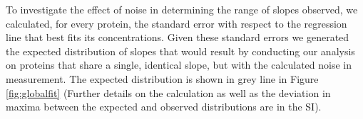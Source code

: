 To investigate the effect of noise in determining the range of slopes observed, we calculated, for every protein, the standard error with respect to the regression line that best fits its concentrations.
Given these standard errors we generated the expected distribution of slopes that would result by conducting our analysis on proteins that share a single, identical slope, but with the calculated noise in measurement.
The expected distribution is shown in grey line in Figure \ref{fig:globalfit} (Further details on the calculation as well as the deviation in maxima between the expected and observed distributions are in the SI).